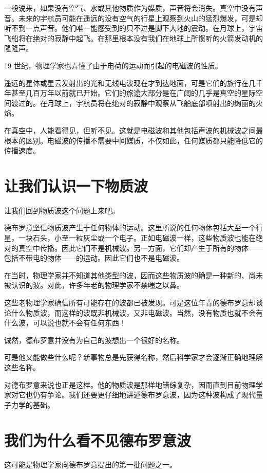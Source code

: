 一般说来，如果没有空气、水或其他物质作为媒质，声音将会消失。真空中没有声音。未来的宇航员可能在遥远的没有空气的行星上观察到火山的猛烈爆发，可是却听不到一点声音。他们唯一能感受到的只不过是脚下大地的震动。在月球上，宇宙飞船将在绝对的寂静中起飞。在那里根本没有我们在地球上所惯听的火箭发动机的隆隆声。

19 世纪，物理学家也弄懂了由于电荷的运动而引起的电磁波的性质。

遥远的星体或星云发射出的光和无线电波现在才到达地面，可是它们的旅行在几千年甚至几百万年以前就已开始。它们的旅途大部分是在广阔的几乎是真空的星际空间渡过的。在月球上，宇航员将在绝对的寂静中观察从飞船底部喷射出的绚丽的火焰。

在真空中，人能看得见，但听不见。这就是电磁波和其他包括声波的机械波之间最根本的区别。电磁波的传播不需要中间媒质，不仅如此，任何媒质都只能降低它的传播速度。

\section{让我们认识一下物质波}

让我们回到物质波这个问题上来吧。

德布罗意坚信物质波产生于任何物体的运动。这里所说的任何物休包括大至一个行星，一块石头，小至一粒灰尘或一个电子。正如电磁波一样，这些物质波也能在绝对的真空中传播。因此它们不是机械波。另一方面，它们却产生于所有的物体——包括不带电的物体——的运动。因此它们也不是电磁波。

在当时，物理学家并不知道其他类型的波，因而这些物质波的确是一种新的、尚未被认识的波。对此，许多年老的物理学家不禁嗤之以鼻。

这些老物理学家确信所有可能存在的波都已被发现。可是这位年青的德布罗意却谈论什么物质波，而这样的波既非机械波，又非电磁波。当然，没有物质也就不会有什么波，可以说也就不会有任何东西！

诚然，德布罗意并没有为自己的波想出一个很好的名称。

可是他又能做些什么呢？新事物总是先获得名称，然后科学家才会逐渐正确地理解这些名称。

对德布罗意来说也正是这样。他的物质波是那样地错综复杂，因而直到目前物理学家对它也仍有争论。我们还要更仔细地讲述德布罗意波，因为这种波构成了现代量子力学的基础。

\section{我们为什么看不见德布罗意波}

这可能是物理学家向德布罗意提出的第一批问题之一。

